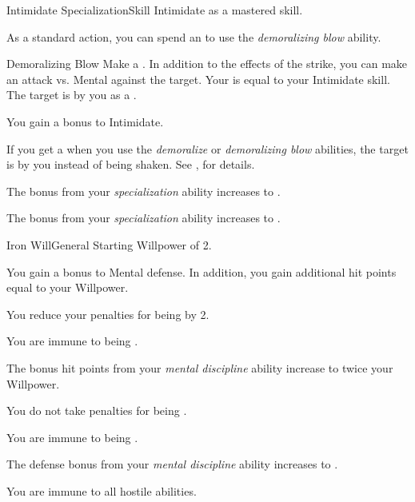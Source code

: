     \begin{feat}{Intimidate Specialization}{Skill}
        \featpre Intimidate as a mastered skill.

         As a standard action, you can spend an  to use the \textit{demoralizing blow} ability.
        \begin{ability}{Demoralizing Blow}
            Make a .
            In addition to the effects of the strike, you can make an attack vs. Mental against the target.
            Your  is equal to your Intimidate skill.
            \hit The target is \shaken by you as a .
        \end{ability}

         You gain a  bonus to Intimidate.

         If you get a  when you use the \textit{demoralize} or \textit{demoralizing blow} abilities, the target is \frightened by you instead of being shaken.
        See , for details.

         The bonus from your \textit{specialization} ability increases to .

         The bonus from your \textit{specialization} ability increases to .
    \end{feat}

    \begin{feat}{Iron Will}{General}
        \featpre Starting Willpower of 2.

         You gain a  bonus to Mental defense.
        In addition, you gain additional hit points equal to your Willpower.

         You reduce your penalties for being  by 2.

         You are immune to being .

         The bonus hit points from your \textit{mental discipline} ability increase to twice your Willpower.

         You do not take penalties for being .

         You are immune to being .

         The defense bonus from your \textit{mental discipline} ability increases to .

         You are immune to all hostile  abilities.
    \end{feat}

